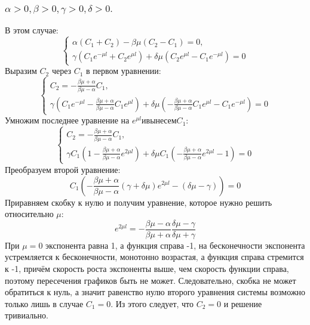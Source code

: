 \documentclass[12pt, a4paper]{article}
\begin{document}
\subsubsection{ $ \alpha > 0, \beta > 0, \gamma > 0, \delta > 0. $}
В этом случае:
\begin{displaymath}
	\begin{cases}
		\alpha (C_{1} + C_{2}) - \beta \mu (C_{2} - C_{1}) = 0, \\
		\gamma (C_{1} e^{-\mu l} + C_{2} e^{\mu l}) + \delta \mu (C_{2} e^{\mu l} - C_{1} e^{-\mu l}) = 0
	\end{cases}
\end{displaymath}
Выразим $C_{2}$ через $C_{1}$ в первом уравнении:
\begin{displaymath}
	\begin{cases}
		C_{2} = -\frac{\beta \mu + \alpha}{\beta \mu - \alpha} C_{1}, \\
		\gamma (C_{1} e^{-\mu l} -\frac{\beta \mu + \alpha}{\beta \mu - \alpha} C_{1} e^{\mu l}) + \delta \mu (-\frac{\beta \mu + \alpha}{\beta \mu - \alpha} C_{1} e^{\mu l} - C_{1} e^{-\mu l}) = 0
	\end{cases}
\end{displaymath}
Умножим последнее уравнение на $e^{\mu l} и вынесем C_{1}$:
\begin{displaymath}
	\begin{cases}
		C_{2} = -\frac{\beta \mu + \alpha}{\beta \mu - \alpha} C_{1}, \\
		\gamma C_{1}(1 -\frac{\beta \mu + \alpha}{\beta \mu - \alpha} e^{2 \mu l}) + \delta \mu C_{1} (-\frac{\beta \mu + \alpha}{\beta \mu - \alpha} e^{2\mu l} - 1) = 0
	\end{cases}
\end{displaymath}
Преобразуем второй уравнение:
\[ C_{1} ( -\frac{\beta \mu + \alpha}{\beta \mu - \alpha} (\gamma + \delta \mu ) e^{2 \mu l} - (\delta \mu - \gamma)) = 0 \]
Приравняем скобку к нулю и получим уравнение, которое нужно решить относительно $\mu$:
\[ e^{2\mu l} = - \frac{\beta \mu - \alpha}{\beta \mu + \alpha} \frac{\delta \mu - \gamma}{\delta \mu + \gamma}\]
При $\mu = 0$ экспонента равна 1, а функция справа -1, на бесконечности экспонента устремляется к бесконечности, монотонно возрастая, а функция справа стремится к -1, причём скорость роста экспоненты выше, чем скорость функции справа, поэтому пересечения графиков быть не может. Следовательно, скобка не может обратиться к нуль, а значит равенство нулю второго уравнения системы возможно только лишь в случае $C_{1} = 0$. Из этого следует, что $C_{2} = 0$ и решение тривиально.
\end{document}
